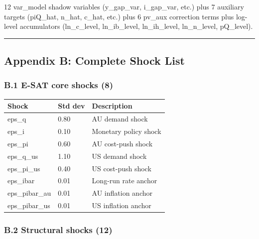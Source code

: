 \documentclass[
]{article}
\newcounter{none} %
\begin{document}
12 var\_model shadow variables (y\_gap\_var, i\_gap\_var, etc.) plus 7
auxiliary targets (piQ\_hat, n\_hat, c\_hat, etc.) plus 6 pv\_aux
correction terms plus log-level accumulators (ln\_c\_level,
ln\_ib\_level, ln\_ih\_level, ln\_n\_level, pQ\_level).

\begin{center}\rule{0.5\linewidth}{0.5pt}\end{center}

\subsection{Appendix B: Complete Shock
List}\label{appendix-b-complete-shock-list}

\subsubsection{B.1 E-SAT core shocks (8)}\label{b.1-e-sat-core-shocks-8}

{\def\LTcaptype{none} %
\begin{longtable}[]{@{}lll@{}}
\toprule\noalign{}
Shock & Std dev & Description \\
\midrule\noalign{}
\endhead
\bottomrule\noalign{}
\endlastfoot
eps\_q & 0.80 & AU demand shock \\
eps\_i & 0.10 & Monetary policy shock \\
eps\_pi & 0.60 & AU cost-push shock \\
eps\_q\_us & 1.10 & US demand shock \\
eps\_pi\_us & 0.40 & US cost-push shock \\
eps\_ibar & 0.01 & Long-run rate anchor \\
eps\_pibar\_au & 0.01 & AU inflation anchor \\
eps\_pibar\_us & 0.01 & US inflation anchor \\
\end{longtable}
}

\subsubsection{B.2 Structural shocks
(12)}\label{b.2-structural-shocks-12}
\end{document}
